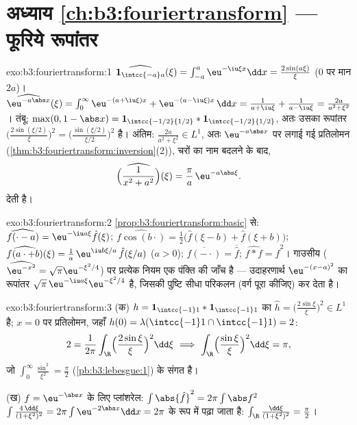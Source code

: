 \section*{अध्याय \ref{ch:b3:fouriertransform} --- फूरिये
रूपांतर}

\begin{solution}{exo:b3:fouriertransform:1}
$\widehat{\mathbf 1_{\intcc{-a}a}}(\xi) =
\int_{-a}^a\eu^{-\iu\xi x}\dd x = \frac{2\sin(a\xi)}{\xi}$
($0$ पर मान $2a$)। $\widehat{\eu^{-a\abs x}}(\xi) = \int_0^\infty\eu^{-(a +
\iu\xi)x} + \eu^{-(a - \iu\xi)x}\,\dd x = \frac1{a + \iu\xi} +
\frac1{a - \iu\xi} = \frac{2a}{a^2 + \xi^2}$। तंबू: $\max(0, 1 - \abs x) = \mathbf 1_{\intcc{-1/2}{1/2}} *
\mathbf 1_{\intcc{-1/2}{1/2}}$, अतः उसका रूपांतर $\bigl(\frac{2\sin(\xi/2)}\xi\bigr)^2 =
\bigl(\frac{\sin(\xi/2)}{\xi/2}\bigr)^2$ है। अंतिम:
$\frac{2a}{a^2+\xi^2} \in L^1$, अतः $\eu^{-a\abs x}$ पर लगाई गई प्रतिलोमन (\cref{thm:b3:fouriertransform:inversion}(2)), चरों का नाम बदलने के
बाद,
\[
\widehat{\Bigl(\frac1{x^2 + a^2}\Bigr)}(\xi) =
\frac{\pi}{a}\,\eu^{-a\abs\xi} .
\]
देती है।
\end{solution}

\begin{solution}{exo:b3:fouriertransform:2}
\cref{prop:b3:fouriertransform:basic} से: $\widehat{f(\cdot - a)} = \eu^{-\iu a\xi}\hat f(\xi)$; $\widehat{f\cos(b\cdot)} = \frac12\bigl(\hat f(\xi - b) + \hat
f(\xi + b)\bigr)$; $\widehat{f(a\cdot + b)}(\xi) = \frac1a\,\eu^{\iu
b\xi/a}\,\hat f(\xi/a)$ ($a > 0$); $\widehat{\overline{f(-\cdot)}} = \overline{\hat f}$; $\widehat{f * f} = \hat f^2$। गाउसीय ($\widehat{\eu^{-x^2}} = \sqrt\pi\eu^{-\xi^2/4}$) पर
प्रत्येक नियम एक पंक्ति की जाँच है --- उदाहरणार्थ $\eu^{-(x-a)^2}$ का रूपांतर
$\sqrt\pi\,\eu^{-\iu a\xi}\eu^{-\xi^2/4}$ है, जिसकी पुष्टि सीधा परिकलन (वर्ग पूरा कीजिए) कर देता है।
\end{solution}

\begin{solution}{exo:b3:fouriertransform:3}
(क) $h = \mathbf 1_{\intcc{-1}1}*\mathbf 1_{\intcc{-1}1}$ का $\hat h = \bigl(\frac{2\sin\xi}\xi\bigr)^2 \in L^1$ है; $x = 0$ पर प्रतिलोमन, जहाँ $h(0) = \lambda(\intcc{-1}1\cap\intcc{-1}1)
= 2$:
\[
2 = \frac1{2\pi}\int_\R\Bigl(\frac{2\sin\xi}\xi\Bigr)^2
\dd\xi
\ \Longrightarrow\
\int_\R\Bigl(\frac{\sin\xi}\xi\Bigr)^2\dd\xi = \pi ,
\]
जो $\int_0^\infty\frac{\sin^2}{\xi^2} =
\frac\pi2$ (\cref{pb:b3:lebesgue:1}) के संगत है।

(ख) $f = \eu^{-\abs x}$ के लिए प्लांशरेल: $\int\abs{\hat f}^2 =
2\pi\int\abs f^2$ $\int\frac{4\,\dd\xi}{(1 + \xi^2)^2} =
2\pi\int\eu^{-2\abs x}\dd x = 2\pi$ के रूप में पढ़ा जाता है: $\int_\R\frac{\dd\xi}{(1+\xi^2)^2} = \frac\pi2$।
\end{solution}

